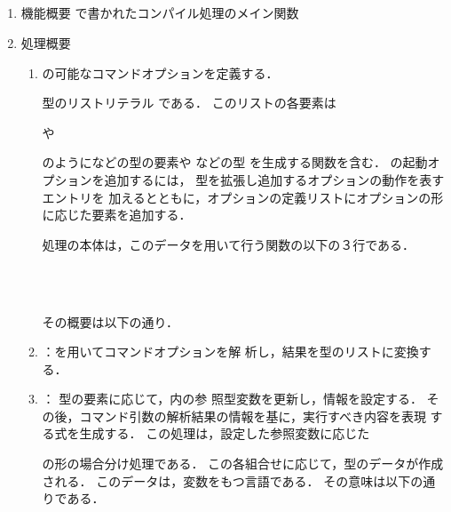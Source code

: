 \subsection{}
\begin{enumerate}
\item 機能概要 \smlsharp{}で書かれたコンパイル処理のメイン関数
\item 処理概要 
\begin{enumerate}
\item \smlsharp{}の可能なコマンドオプションを定義する．

	型のリストリテラル
である．
	このリストの各要素は
\begin{program}
\end{program}
や
\begin{program}
\end{program}
のようになどの型の要素や
などの型
を生成する関数を含む．
	\smlsharp{}の起動オプションを追加するには，
型を拡張し追加するオプションの動作を表すエントリを
加えるとともに，オプションの定義リストにオプションの形に応じた要素を追加する．

処理の本体は，このデータを用いて行う関数の以下の３行である．
\begin{program}
\\
\\
\end{program}
その概要は以下の通り．

\item {}：を用いてコマンドオプションを解
析し，結果を型のリストに変換する．
\item {}：
	型の要素に応じて，内の参
照型変数を更新し，情報を設定する．
	その後，コマンド引数の解析結果の情報を基に，実行すべき内容を表現
する式を生成する．
	この処理は，設定した参照変数に応じた
\begin{program}
\end{program}
の形の場合分け処理である．
	この各組合せに応じて，型のデータが作成される．
	このデータは，変数をもつ言語である．
	その意味は以下の通りである．


\end{enumerate}
\end{enumerate}
